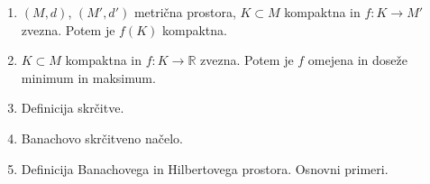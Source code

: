 \documentclass[a4paper,12pt]{report}
\begin{document}
\begin{enumerate}
    \item $(M, d)$, $(M', d')$ metrična prostora, $K \subset M$ kompaktna in $f: K \to M'$ zvezna. Potem je $f(K)$ kompaktna.
    \item $K \subset M$ kompaktna in $f: K \to \mathbb{R}$ zvezna. Potem je $f$ omejena in doseže minimum in maksimum.
    \item Definicija skrčitve.
    \item Banachovo skrčitveno načelo.
    \item Definicija Banachovega in Hilbertovega prostora. Osnovni primeri.
\end{enumerate}
\end{document}
